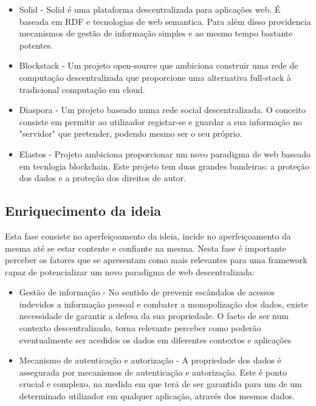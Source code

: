 \begin{itemize}

\item Solid - Solid é uma plataforma descentralizada para aplicações web. É baseada em RDF e tecnologias de web semantica. Para além disso providencia mecanismos de gestão de informação simples e ao mesmo tempo bastante potentes.\cite{solid_spec}

\item Blockstack - Um projeto open-source que ambiciona construir uma rede de computação descentralizada que proporcione uma alternativa full-stack à tradicional computação em cloud.\cite{blockstack_white_paper}

\item Diaspora - Um projeto baseado numa rede social descentralizada. O conceito consiste em permitir ao utilizador registar-se e guardar a sua informação no  "servidor" que pretender, podendo mesmo ser o seu próprio.\cite{diaspora_wiki}

\item Elastos - Projeto ambiciona proporcionar um novo paradigma de web baseado em tecnlogia blockchain. Este projeto tem duas grandes bandeiras: a proteção dos dados e a proteção dos direitos de autor.\cite{elastos_white_paper}

\end{itemize}

\subsection{Enriquecimento da ideia}
Esta fase consiste no aperfeiçoamento da ideia, incide no aperfeiçoamento da mesma até se estar contente e confiante na mesma.
Nesta fase é importante perceber os fatores que se apresentam como mais relevantes para uma framework capaz de potencializar um novo paradigma de web descentralizada:

\begin{itemize}
\item  Gestão de informação - No sentido de prevenir escândalos de acessos indevidos a informação pessoal e combater a monopolização dos dados, existe necessidade de garantir a defesa da sua propriedade. O facto de ser num contexto descentralizado, torna relevante perceber como poderão eventualmente ser acedidos os dados em diferentes contextos e aplicações

\item Mecanismo de autenticação e autorização - A propriedade dos dados é assegurada por mecanismos de autenticação e autorização. Este é ponto crucial e complexo, na medida em que terá de ser garantida para um de um determinado utilizador em qualquer aplicação, através dos mesmos dados.

\end{itemize}

